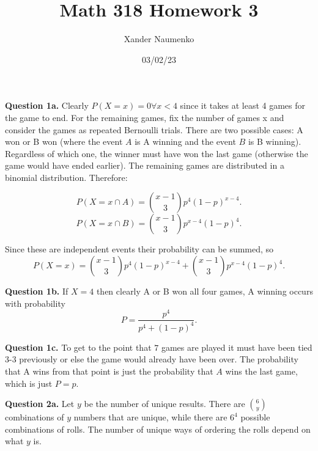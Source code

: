 \documentclass[letterpaper, reqno,11pt]{article}
\begin{document}
\title{Math 318 Homework 3}
\date{03/02/23}
\author{Xander Naumenko}
\maketitle

{\medskip\noindent\bf Question 1a.} Clearly $P(X=x)=0\forall x<4$ since it takes at least 4 games for the game to end. For the remaining games, fix the number of games x and consider the games as repeated Bernoulli trials. There are two possible cases: A won or B won (where the event $A$ is A winning and the event $B$ is B winning). Regardless of which one, the winner must have won the last game (otherwise the game would have ended earlier). The remaining games are distributed in a binomial distribution. Therefore:

\[
    P(X=x\cap A)={x-1\choose 3}p^{4}(1-p)^{x-4}
.\]
\[
    P(X=x\cap B)={x-1\choose 3}p^{x-4}(1-p)^{4}
.\]

Since these are independent events their probability can be summed, so
\[
P(X=x)={x-1\choose 3}p^{4}(1-p)^{x-4}+{x-1\choose 3}p^{x-4}(1-p)^{4}
.\]

{\medskip\noindent\bf Question 1b.} If $X=4$ then clearly A or B won all four games, A winning occurs with probability 
\[
P=\frac{p^{4}}{p^{4}+(1-p)^{4}}
.\]


{\medskip\noindent\bf Question 1c.} To get to the point that $7$ games are played it must have been tied 3-3 previously or else the game would already have been over. The probability that A wins from that point is just the probability that $A$ wins the last game, which is just $P=p$. 


{\medskip\noindent\bf Question 2a.} Let $y$ be the number of unique results. There are ${6\choose y}$ combinations of $y$ numbers that are unique, while there are $6^{4}$ possible combinations of rolls. The number of unique ways of ordering the rolls depend on what $y$ is. 
\end{document}
